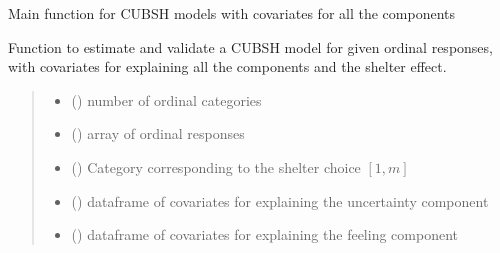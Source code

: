 \documentclass[letterpaper,10pt,english]{sphinxmanual}
\begin{document}
\begin{fulllineitems}
\label{\detokenize{cubmods:cubmods.cubsh_ywx.mle}}
\pysigstartsignatures
{}
\pysigstopsignatures
\sphinxAtStartPar
Main function for CUBSH models with covariates for all the components

\sphinxAtStartPar
Function to estimate and validate a CUBSH model for given ordinal responses, with covariates for
explaining all the components and the shelter effect.
\begin{quote}\begin{description}
\begin{itemize}
\item {} 
\sphinxAtStartPar
{} () \textendash{} number of ordinal categories

\item {} 
\sphinxAtStartPar
{} () \textendash{} array of ordinal responses

\item {} 
\sphinxAtStartPar
{} () \textendash{} Category corresponding to the shelter choice \([1,m]\)

\item {} 
\sphinxAtStartPar
{} () \textendash{} dataframe of covariates for explaining the uncertainty component

\item {} 
\sphinxAtStartPar
{} () \textendash{} dataframe of covariates for explaining the feeling component


\end{itemize}
\end{description}
\end{quote}
\end{fulllineitems}
\end{document}

